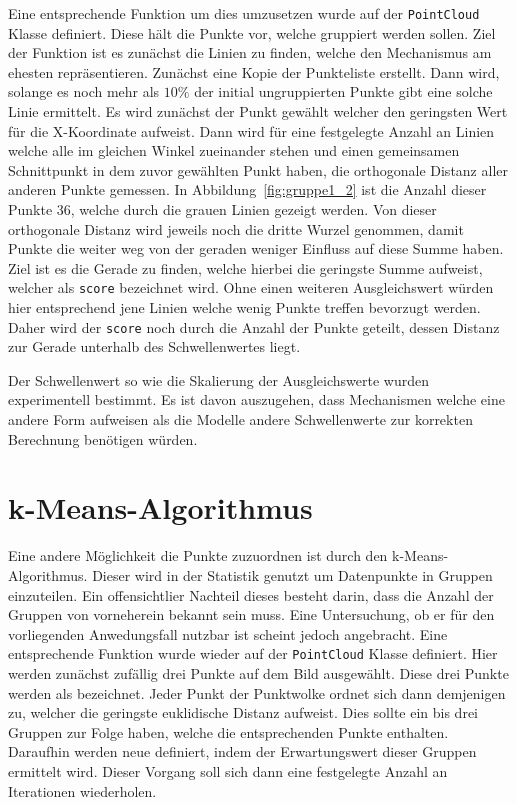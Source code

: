 Eine entsprechende Funktion um dies umzusetzen wurde auf der \lstinline{PointCloud} Klasse definiert.
Diese hält die Punkte vor, welche gruppiert werden sollen.
Ziel der Funktion ist es zunächst die Linien zu finden, welche den Mechanismus am ehesten repräsentieren.
Zunächst eine Kopie der Punkteliste erstellt.
Dann wird, solange es noch mehr als $10\%$ der initial ungruppierten Punkte gibt eine solche Linie ermittelt.
Es wird zunächst der Punkt gewählt welcher den geringsten Wert für die X-Koordinate aufweist.
Dann wird für eine festgelegte Anzahl an Linien welche alle im gleichen Winkel zueinander stehen und einen gemeinsamen Schnittpunkt in dem zuvor gewählten Punkt haben, die orthogonale Distanz aller anderen Punkte gemessen.
In Abbildung~\ref{fig:gruppe1_2} ist die Anzahl dieser Punkte 36, welche durch die grauen Linien gezeigt werden.
Von dieser orthogonale Distanz wird jeweils noch die dritte Wurzel genommen, damit Punkte die weiter weg von der geraden weniger Einfluss auf diese Summe haben.
Ziel ist es die Gerade zu finden, welche hierbei die geringste Summe aufweist, welcher als \lstinline{score} bezeichnet wird.
Ohne einen weiteren Ausgleichswert würden hier entsprechend jene Linien welche wenig Punkte treffen bevorzugt werden.
Daher wird der \lstinline{score} noch durch die Anzahl der Punkte geteilt, dessen Distanz zur Gerade unterhalb des Schwellenwertes liegt.

Der Schwellenwert so wie die Skalierung der Ausgleichswerte wurden experimentell bestimmt.
Es ist davon auszugehen, dass Mechanismen welche eine andere Form aufweisen als die  Modelle andere Schwellenwerte zur korrekten Berechnung benötigen würden.



\section{k-Means-Algorithmus}

Eine andere Möglichkeit die Punkte zuzuordnen ist durch den k-Means-Algorithmus.
Dieser wird in der Statistik genutzt um Datenpunkte in Gruppen einzuteilen.
Ein offensichtlier Nachteil dieses besteht darin, dass die Anzahl der Gruppen von vorneherein bekannt sein muss.
Eine Untersuchung, ob er für den vorliegenden Anwedungsfall nutzbar ist scheint jedoch angebracht.
Eine entsprechende Funktion wurde wieder auf der \lstinline{PointCloud} Klasse definiert.
Hier werden zunächst zufällig drei Punkte auf dem Bild ausgewählt.
Diese drei Punkte werden als  bezeichnet.
Jeder Punkt der Punktwolke ordnet sich dann demjenigen  zu, welcher die geringste euklidische Distanz aufweist.
Dies sollte ein bis drei Gruppen zur Folge haben, welche die entsprechenden Punkte enthalten.
Daraufhin werden neue  definiert, indem der Erwartungswert dieser Gruppen ermittelt wird.
Dieser Vorgang soll sich dann eine festgelegte Anzahl an Iterationen wiederholen.

